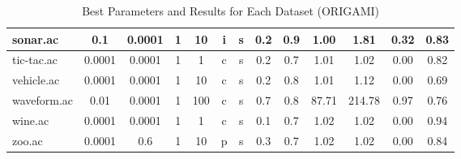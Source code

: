 \begin{table}[htbp]
{\begin{tabular}{|l|c|c|c|c|c|c|c|c||c|c|c|c|}
		\hline
		sonar.ac       & 0.1      & 0.0001      & 1              & 10       & i                   & s        & 0.2    & 0.9   & 1.00           & 1.81           & 0.32           & 0.83           \\
		\hline
		tic-tac.ac     & 0.0001   & 0.0001      & 1              & 1        & c                   & s        & 0.2    & 0.7   & 1.01           & 1.02           & 0.00           & 0.82           \\
		\hline
		vehicle.ac     & 0.0001   & 0.0001      & 1              & 10       & c                   & s        & 0.2    & 0.8   & 1.01           & 1.12           & 0.00           & 0.69           \\
		\hline
		waveform.ac    & 0.01     & 0.0001      & 1              & 100      & c                   & s        & 0.7    & 0.8   & 87.71          & 214.78         & 0.97           & 0.76           \\
		\hline
		wine.ac        & 0.0001   & 0.0001      & 1              & 1        & c                   & s        & 0.1    & 0.7   & 1.02           & 1.02           & 0.00           & 0.94           \\
		\hline
		zoo.ac         & 0.0001   & 0.6         & 1              & 10       & p                   & s        & 0.3    & 0.7   & 1.02           & 1.02           & 0.00           & 0.84           \\
		\hline
		\end{tabular}
		}
	\caption{Best Parameters and Results for Each Dataset (ORIGAMI)}
	\label{tab:best_runs_for_each_db_origami}
\end{table}